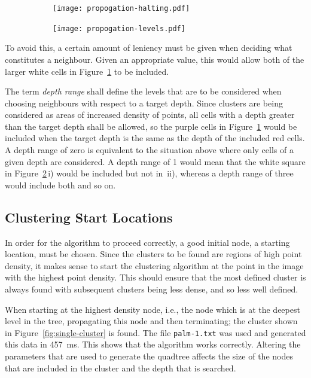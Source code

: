 \begin{figure}[ht]
	\centering
	\begin{subfigure}[c]{0.6\linewidth}
		\texttt{[image: propogation-halting.pdf]}
		\caption{} \label{fig:propogation-halting}
	\end{subfigure}%
	\quad
	\begin{subfigure}[c]{0.35\linewidth}
		\texttt{[image: propogation-levels.pdf]}
		\caption{} \label{fig:propogation-levels}
	\end{subfigure}
	\caption{}\label{fig:prop-levels-halting}
\end{figure}

To avoid this, a certain amount of leniency must be given when deciding what
constitutes a neighbour. Given an appropriate value, this would allow both of
the larger white cells in Figure~\ref{fig:propogation-halting} to be included.

The term \emph{depth range} shall define the levels that are to be considered
when choosing neighbours with respect to a target depth. Since clusters are
being considered as areas of increased density of points, all cells with a
depth greater than the target depth shall be allowed, so the purple cells in
Figure~\ref{fig:propogation-halting} would be included when the target depth is
the same as the depth of the included red cells. A depth range of zero is
equivalent to the situation above where only cells of a given depth are
considered. A depth range of 1 would mean that the white square in
Figure~\ref{fig:propogation-levels}\,i) would be included but not in~ii),
whereas a depth range of three would include both and so on.

\subsection{Clustering Start Locations}
\label{sub:clustering_start_locations}

In order for the algorithm to proceed correctly, a good initial node, a
starting location, must be chosen. Since the clusters to be found are regions
of high point density, it makes sense to start the clustering algorithm at the
point in the image with the highest point density. This should ensure that the
most defined cluster is always found with subsequent clusters being less dense,
and so less well defined.

When starting at the highest density node, i.e., the node which is at the
deepest level in the tree, propagating this node and then terminating; the
cluster shown in Figure~\ref{fig:single-cluster} is found. The file
\texttt{palm-1.txt} was used and generated this data in
\SI{457}{\milli\second}. This shows that the algorithm works correctly.
Altering the parameters that are used to generate the quadtree affects the size
of the nodes that are included in the cluster and the depth that is searched.

